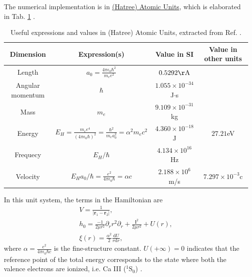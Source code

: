 \documentclass{article}
\begin{document}
The numerical implementation is in \href{https://en.wikipedia.org/wiki/Atomic_units#cite_note-Hartree28-1}{(Hatree) Atomic Units}, which is elaborated in Tab. \ref{tab:units} .
\begin{table}[htbp]
\centering
\caption{Useful expressions and values in (Hatree) Atomic Units, extracted from Ref. \cite{au:wiki} .}\label{tab:units}
\begin{tabular}{c|c|c|c}
\hline\hline
Dimension	&Expression(s)	&Value in SI	&Value in other units \\ \hline
Length		&$a_0 = \frac{4\pi\epsilon_0 \hbar^2}{m_e e^2}$	&$0.5292\mathrm{\AA}$	& \\ \hline
Angular momentum	&$\hbar$	&$1.055\times 10^{-34}$J$\cdot$s	&\\ \hline
Mass	& $m_e$	& $9.109\times 10^{-31}$kg	&	\\ \hline
Energy	&$E_H= \frac{m_e e^4}{(4\pi\epsilon_0\hbar)^2} = \frac{\hbar^2}{m_ea_0^2} = \alpha^2 m_ec^2$	&	$4.360\times 10^{-18}$J	&$27.21$eV \\ \hline
Frequecy	& $E_H/\hbar$	&	$4.134\times 10^{16}$Hz	&\\ \hline
Velocity	& $E_Ha_0/\hbar = \frac{e^2}{4\pi\epsilon_0\hbar} = \alpha c$ 		&$2.188\times 10^{6}$m/s 	& $7.297\times 10^{-3}$c\\ \hline
\end{tabular}
\end{table}
In this unit system, the terms in the Hamiltonian are
\begin{gather}
V = \frac{1}{|\bm{r}_1-\bm{r}_2|},\\
h_0 = \frac{-1}{2\mu r^2}\partial_r r^2\partial_r + \frac{\bm{l}^2}{2\mu r^2} + U(r),\\
\xi(r) = \frac{\alpha^2}{2}\frac{\mathrm{d}U}{r\mathrm{d}r},
\end{gather}
where $\alpha =\frac{e^2}{4\pi\epsilon_0\hbar c}$ is the fine-structure constant. 
$U(+\infty) = 0$ indicates that the reference point of the total energy corresponds to the state where both the valence electrons are ionized, i.e. Ca III (${}^{1}\mathrm{S}_0$) \cite{SC85}.
\end{document}
